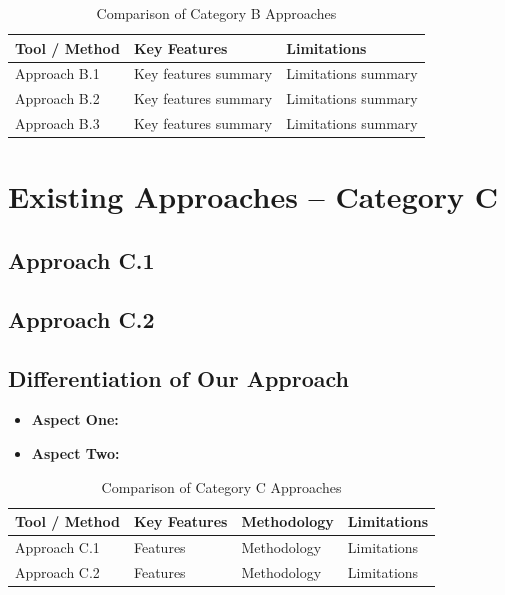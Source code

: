 \documentclass[12pt, a4paper, oneside]{report}
\begin{document}
\begin{table}[H]
\centering
\caption{Comparison of Category B Approaches}
\label{tab:cat-b-comparison}
\small
\begin{tabularx}{\textwidth}{|l|X|X|}
\hline
\textbf{Tool / Method} & \textbf{Key Features} & \textbf{Limitations} \\
\hline
Approach B.1 \cite{ref4} & Key features summary & Limitations summary \\
\hline
Approach B.2 \cite{ref5} & Key features summary & Limitations summary \\
\hline
Approach B.3 \cite{ref6} & Key features summary & Limitations summary \\
\hline
\end{tabularx}
\end{table}

\section{Existing Approaches -- Category C}
\label{sec:category-c}

\lipsum[46][1-4]

\subsection{Approach C.1}
\lipsum[47][1-2] \cite{ref7}

\subsection{Approach C.2}
\lipsum[48][1-2] \cite{ref8}

\subsection{Differentiation of Our Approach}
\lipsum[49][1-3]

\begin{itemize}
    \item \textbf{Aspect One:} \lipsum[50][1-1]
    \item \textbf{Aspect Two:} \lipsum[51][1-1]
\end{itemize}

\begin{table}[H]
\centering
\caption{Comparison of Category C Approaches}
\label{tab:cat-c-comparison}
\small
\begin{tabularx}{\textwidth}{|l|X|X|X|}
\hline
\textbf{Tool / Method} & \textbf{Key Features} & \textbf{Methodology} & \textbf{Limitations} \\
\hline
Approach C.1 \cite{ref7} & Features & Methodology & Limitations \\
\hline
Approach C.2 \cite{ref8} & Features & Methodology & Limitations \\
\hline
\end{tabularx}
\end{table}
\end{document}
